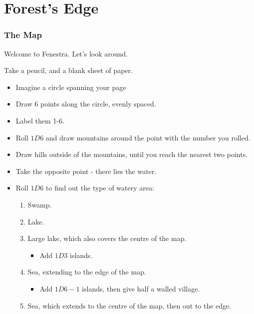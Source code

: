 \chapter{Forest's Edge}

\begin{multicols}{2}

\subsection{The Map}

Welcome to Fenestra. Let's look around.


Take a pencil, and a blank sheet of paper.

\begin{itemize}
\item
  Imagine a circle spanning your page
\item
  Draw 6 points along the circle, evenly spaced.
\item
  Label them 1-6.
\item
  Roll $1D6$ and draw mountains around the point with the number you rolled.
\item
  Draw hills outside of the mountains, until you reach the nearest two
  points.
\item
  Take the opposite point - there lies the water.
\item
  Roll $1D6$ to find out the type of watery area:

  \begin{enumerate}
  \item
    Swamp.
  \item
    Lake.
  \item
    Large lake, which also covers the centre of the map.

    \begin{itemize}
    \item
      Add $1D3$ islands.
    \end{itemize}
  \item
    Sea, extending to the edge of the map.

    \begin{itemize}
    \item
      Add $1D6-1$ islands, then give half a walled village.
    \end{itemize}
  \item
    Sea, which extends to the centre of the map, then out to the edge.


\end{enumerate}
\end{itemize}
\end{multicols}
